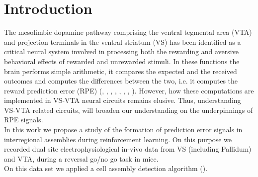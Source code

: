 \chapter{Introduction}
\label{chap:Introduction}
The mesolimbic dopamine pathway comprising the ventral tegmental area (VTA) and projection terminals in the ventral striatum (VS) has been identified as a critical neural system involved in processing both the rewarding and aversive behavioral effects of rewarded and unrewarded stimuli. In these functions the brain performs simple arithmetic, it compares the expected and the received outcomes and computes the differences between the two, i.e. it computes the reward prediction error (RPE) (\cite{Schultz2001}, \cite{Schultz2002}, \cite{Fiorillo}, \cite{Eshel1}, \cite{Pagnoni}, \cite{Radua}, \cite{Takahashi2016}, \cite{TianHuang}). However, how these computations are implemented in VS-VTA neural circuits remains elusive.
Thus, understanding VS-VTA related circuits, will broaden our understanding on the underpinnings of RPE signals.\\In this work we propose a study of the formation of prediction error signals in interregional assemblies during reinforcement learning. On this purpose we recorded dual site electrophysiological in-vivo data from VS (including Pallidum) and VTA, during a reversal go/no go task in mice.\\%
On this data set we applied a cell assembly detection algorithm (\cite{RussoDurstewitz}). %
